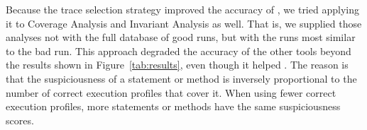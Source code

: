 




Because the trace selection strategy improved the accuracy of \ourtool, we
tried applying it to Coverage Analysis and Invariant Analysis as well.
That is, we supplied those analyses not with the full database of good
runs, but with the runs most similar to the bad run.  This approach
degraded the accuracy of the other tools beyond the results shown in
Figure~\ref{tab:results}, even though it helped \ourtool.  The reason is
that the suspiciousness of a statement or method is inversely proportional
to the number of correct execution profiles that cover it. When using fewer
correct execution profiles, more statements or methods have the same
suspiciousness scores.

